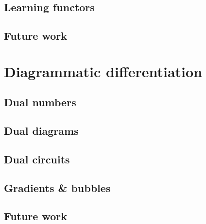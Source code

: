 \section{Learning functors}
\section{Future work}

\chapter{Diagrammatic differentiation} \label{chapter-3:diag-diff}

\section{Dual numbers}
\section{Dual diagrams}
\section{Dual circuits}
\section{Gradients \& bubbles}
\section{Future work}

\setlength{\baselineskip}{0pt} %

{\renewcommand*\MakeUppercase[1]{#1}%
\printbibliography[heading=bibintoc,title=References]}


